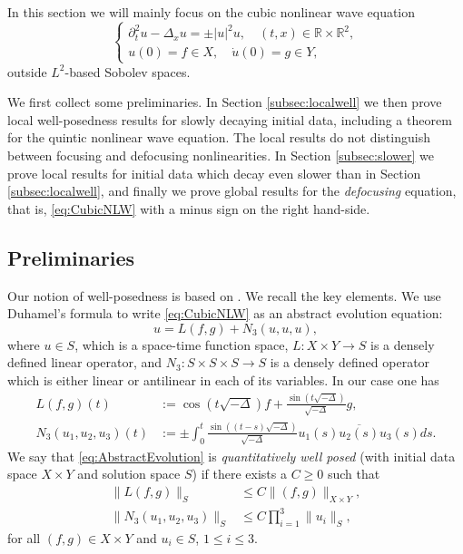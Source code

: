 \documentclass{amsart}
\theoremstyle{definition}
\newcommand{\R}{\mathbb{R}}
\numberwithin{equation}{section}
\begin{document}
In this section we will mainly focus on the cubic nonlinear wave equation
\begin{equation}
\label{eq:CubicNLW}
\begin{cases}
\partial_t^2 u - \Delta_{x} u = \pm |u|^2 u, \quad (t,x) \in \R \times \R^2, \\
u(0) = f \in X, \quad \dot{u}(0) = g \in Y,
\end{cases}
\end{equation}
outside $L^2$-based Sobolev spaces. 

We first collect some preliminaries. In Section \ref{subsec:localwell} we then prove local well-posedness results for slowly decaying initial data, including a theorem for the quintic nonlinear wave equation. The local results do not distinguish between focusing and defocusing nonlinearities. In Section \ref{subsec:slower} we prove local results for initial data which decay even slower than in Section \ref{subsec:localwell}, and finally we prove global results for the \emph{defocusing} equation, that is, \eqref{eq:CubicNLW} with a minus sign on the right hand-side.

\subsection{Preliminaries}\label{subsec:prelim}

Our notion of well-posedness is based on \cite[Section~3]{BejenaruTao2006}. We recall the key elements. We use Duhamel's formula to write \eqref{eq:CubicNLW} as an abstract evolution equation:
\begin{equation}
\label{eq:AbstractEvolution}
u = L(f,g) + N_3(u,u,u),
\end{equation}
where $u \in S$, which is a space-time function space, $L: X \times Y \to S$ is a densely defined linear operator, and $N_3:S \times S \times S \to S$ is a densely defined operator which is either linear or antilinear in each of its variables. In our case one has
\begin{equation*}
\begin{split}
L(f,g)(t)&:=\cos(t\sqrt{-\Delta})f+\frac{\sin(t\sqrt{-\Delta})}{\sqrt{-\Delta}}g, \\
N_{3}(u_{1},u_{2},u_{3})(t)&:=\pm \int_{0}^{t}\frac{\sin((t-s)\sqrt{-\Delta})}{\sqrt{-\Delta}}u_{1}(s)\overline{u_{2}(s)}u_{3}(s)ds.
\end{split}
\end{equation*}
 We say that \eqref{eq:AbstractEvolution} is \emph{quantitatively well posed} (with initial data space $X \times Y$ and solution space $S$) if there exists a $C\geq0$ such that
\begin{align}
\label{eq:LinearAbstractEstimate}
\| L(f,g) \|_{S} &\leq C \| (f,g) \|_{X \times Y}, \\
\label{eq:NonLinearAbstractEstimate}
\| N_3(u_1,u_2,u_3) \|_S &\leq C \prod_{i=1}^3 \| u_i \|_S,
\end{align}
for all $(f,g) \in X \times Y$ and $u_i \in S$, $1\leq i\leq 3$. 
\end{document}
